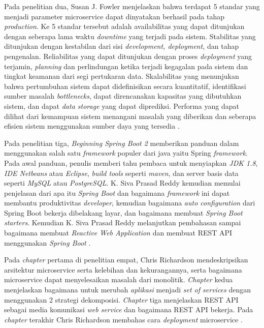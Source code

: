 Pada penelitian dua, Susan J. Fowler menjelaskan bahwa terdapat 5 standar yang menjadi parameter microservice dapat dinyatakan berhasil pada tahap \textit{production}. Ke 5 standar tersebut adalah availabilitas yang dapat ditunjukan dengan seberapa lama waktu \textit{downtime} yang terjadi pada sistem. Stabilitas yang ditunjukan dengan kestabilan dari sisi \textit{development, deployment,} dan tahap pengenalan. Reliabilitas yang dapat ditunjukan dengan proses \textit{deployment} yang terjamin, \textit{planning} dan perlindungan ketika terjadi kegagalan pada sistem dan tingkat keamanan dari segi pertukaran data. Skalabilitas yang menunjukan bahwa pertumbuhan sistem dapat didefinisikan secara kuantitatif, identifikasi sumber masalah \textit{bottlenecks}, dapat direncanakan kapasitas yang dibutuhkan sistem, dan dapat \textit{data storage} yang dapat diprediksi. Performa yang dapat dilihat dari kemampuan sistem menangani masalah yang diberikan dan seberapa efisien sistem menggunakan sumber daya yang tersedia \cite{10}.

Pada penelitian tiga, \textit{Beginning Spring Boot 2} memberikan panduan dalam menggunakan salah satu \textit{framework} populer dari java yaitu Spring \textit{framework}. Pada awal panduan, penulis memberi tahu pembaca untuk menyiapkan \textit{JDK 1.8}, \textit{IDE Netbeans} atau \textit{Eclipse}, \textit{build tools} seperti \textit{maven}, dan server basis data seperti \textit{MySQL} atau \textit{PostgreSQL}. K. Siva Prasad Reddy kemudian memulai penjelasan dari apa itu \textit{Spring Boot} dan bagaimana \textit{framework} ini dapat membantu produktivitas \textit{developer}, kemudian bagaimana \textit{auto configuration} dari Spring Boot bekerja dibelakang layar, dan bagaimana membuat \textit{Spring Boot starters}. Kemudian K. Siva Prasad Reddy melanjutkan pembahasan sampai bagaimana membuat \textit{Reactive Web Application} dan membuat REST API menggunakan \textit{Spring Boot} \cite{11}.

Pada \textit{chapter} pertama di penelitian empat, Chris Richardson mendeskripsikan arsitektur microservice serta kelebihan dan kekurangannya, serta bagaimana microservice dapat menyelesaikan masalah dari monolitik. \textit{Chapter} kedua menjelaskan bagaimana untuk merubah \textit{aplikasi} menjadi \textit{set of services} dengan menggunakan 2 strategi dekomposisi. \textit{Chapter} tiga menjelaskan REST API sebagai media komunikasi \textit{web service} dan bagaimana REST API bekerja. Pada \textit{chapter} terakhir Chris Richardson membahas cara \textit{deployment} microservice \cite{13}.

